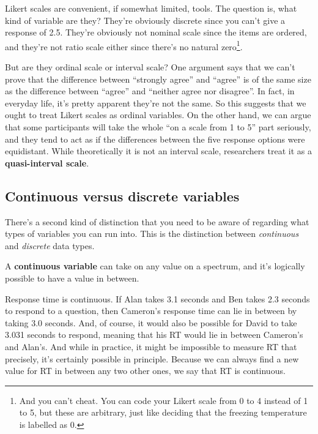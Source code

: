 \documentclass[
  11pt,
  a4paper,
  twoside,symmetric,openright]{book}
\theoremstyle{break}
\theoremstyle{break}
\begin{document}
Likert scales are convenient, if somewhat limited, tools. The question is, what kind of variable are they? They're obviously discrete since you can't give a response of 2.5. They're obviously not nominal scale since the items are ordered, and they're not ratio scale either since there's no natural zero\footnote{And you can't cheat. You can code your Likert scale from 0 to 4 instead of 1 to 5, but these are arbitrary, just like deciding that the freezing temperature is labelled as 0.}.

But are they ordinal scale or interval scale? One argument says that we can't prove that the difference between ``strongly agree'' and ``agree'' is of the same size as the difference between ``agree'' and ``neither agree nor disagree''. In fact, in everyday life, it's pretty apparent they're not the same. So this suggests that we ought to treat Likert scales as ordinal variables. On the other hand, we can argue that some participants will take the whole ``on a scale from 1 to 5'' part seriously, and they tend to act as if the differences between the five response options were equidistant. While theoretically it is not an interval scale, researchers treat it as a \textbf{quasi-interval scale}.

\subsection{Continuous versus discrete variables}\label{continuousdiscrete}

There's a second kind of distinction that you need to be aware of regarding what types of variables you can run into. This is the distinction between \emph{continuous} and \emph{discrete} data types.

\begin{definition}
\protect\hypertarget{def:defcontinuous}{}\label{def:defcontinuous}A \textbf{continuous variable} can take on any value on a spectrum, and it's logically possible to have a value in between.
\end{definition}

\begin{example}
\protect\hypertarget{exm:excontinuous}{}\label{exm:excontinuous}Response time is continuous. If Alan takes 3.1 seconds and Ben takes 2.3 seconds to respond to a question, then Cameron's response time can lie in between by taking 3.0 seconds. And, of course, it would also be possible for David to take 3.031 seconds to respond, meaning that his RT would lie in between Cameron's and Alan's. And while in practice, it might be impossible to measure RT that precisely, it's certainly possible in principle. Because we can always find a new value for RT in between any two other ones, we say that RT is continuous.
\end{example}
\end{document}
